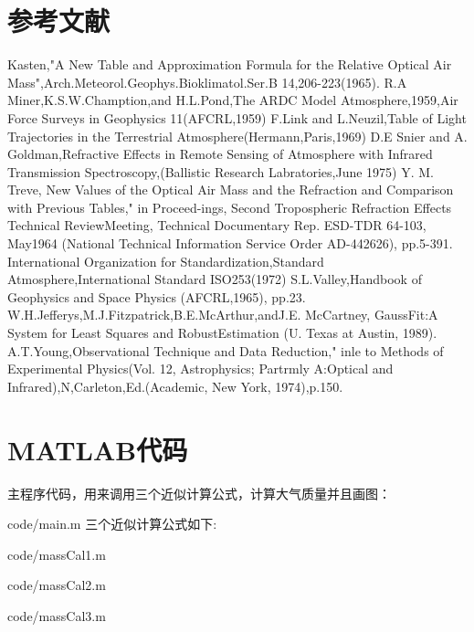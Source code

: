 \documentclass{aaa}
\begin{document}
\section{参考文献}
\begin{thebibliography}{9}%
Kasten,"A New Table and Approximation Formula for the Relative Optical Air Mass",Arch.Meteorol.Geophys.Bioklimatol.Ser.B 14,206-223(1965).
R.A Miner,K.S.W.Chamption,and H.L.Pond,The ARDC Model Atmosphere,1959,Air Force Surveys in Geophysics 11(AFCRL,1959)
F.Link and L.Neuzil,Table of Light Trajectories in the Terrestrial Atmosphere(Hermann,Paris,1969)
D.E Snier and A. Goldman,Refractive Effects in Remote Sensing of Atmosphere with Infrared Transmission Spectroscopy,(Ballistic Research Labratories,June 1975)
Y. M. Treve, New Values of the Optical Air Mass and the
Refraction and Comparison with Previous Tables," in Proceed-ings, Second Tropospheric Refraction Effects Technical ReviewMeeting, Technical Documentary Rep. ESD-TDR 64-103, May1964 (National Technical Information Service Order AD-442626), pp.5-391.
International Organization for Standardization,Standard Atmosphere,International Standard ISO253(1972)
S.L.Valley,Handbook of Geophysics and Space Physics
(AFCRL,1965), pp.23.
W.H.Jefferys,M.J.Fitzpatrick,B.E.McArthur,andJ.E.
McCartney, GaussFit:A System for Least Squares and RobustEstimation (U. Texas at Austin, 1989).
A.T.Young,Observational Technique and Data Reduction," inle to Methods of Experimental Physics(Vol. 12, Astrophysics; Partrmly A:Optical and Infrared),N,Carleton,Ed.(Academic, New York, 1974),p.150.

\end{thebibliography}

\section{MATLAB代码}
主程序代码，用来调用三个近似计算公式，计算大气质量并且画图：

{code/main.m}
三个近似计算公式如下:

{code/massCal1.m}


{code/massCal2.m}


{code/massCal3.m}
\end{document}
